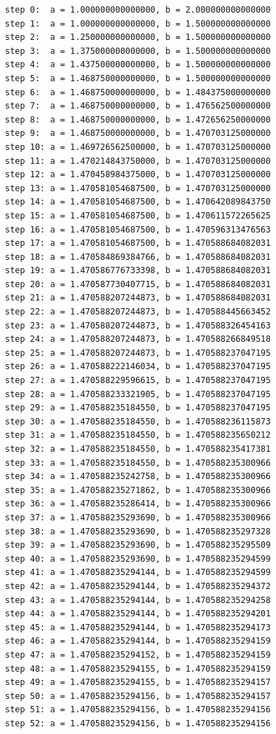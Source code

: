 \documentclass[12pt]{article}
\begin{document}
\begin{minipage}{\linewidth}
\begin{lstlisting}
step 0:  a = 1.000000000000000, b = 2.000000000000000
step 1:  a = 1.000000000000000, b = 1.500000000000000
step 2:  a = 1.250000000000000, b = 1.500000000000000
step 3:  a = 1.375000000000000, b = 1.500000000000000
step 4:  a = 1.437500000000000, b = 1.500000000000000
step 5:  a = 1.468750000000000, b = 1.500000000000000
step 6:  a = 1.468750000000000, b = 1.484375000000000
step 7:  a = 1.468750000000000, b = 1.476562500000000
step 8:  a = 1.468750000000000, b = 1.472656250000000
step 9:  a = 1.468750000000000, b = 1.470703125000000
step 10: a = 1.469726562500000, b = 1.470703125000000
step 11: a = 1.470214843750000, b = 1.470703125000000
step 12: a = 1.470458984375000, b = 1.470703125000000
step 13: a = 1.470581054687500, b = 1.470703125000000
step 14: a = 1.470581054687500, b = 1.470642089843750
step 15: a = 1.470581054687500, b = 1.470611572265625
step 16: a = 1.470581054687500, b = 1.470596313476563
step 17: a = 1.470581054687500, b = 1.470588684082031
step 18: a = 1.470584869384766, b = 1.470588684082031
step 19: a = 1.470586776733398, b = 1.470588684082031
step 20: a = 1.470587730407715, b = 1.470588684082031
step 21: a = 1.470588207244873, b = 1.470588684082031
step 22: a = 1.470588207244873, b = 1.470588445663452
step 23: a = 1.470588207244873, b = 1.470588326454163
step 24: a = 1.470588207244873, b = 1.470588266849518
step 25: a = 1.470588207244873, b = 1.470588237047195
step 26: a = 1.470588222146034, b = 1.470588237047195
step 27: a = 1.470588229596615, b = 1.470588237047195
step 28: a = 1.470588233321905, b = 1.470588237047195
step 29: a = 1.470588235184550, b = 1.470588237047195
step 30: a = 1.470588235184550, b = 1.470588236115873
step 31: a = 1.470588235184550, b = 1.470588235650212
step 32: a = 1.470588235184550, b = 1.470588235417381
step 33: a = 1.470588235184550, b = 1.470588235300966
step 34: a = 1.470588235242758, b = 1.470588235300966
step 35: a = 1.470588235271862, b = 1.470588235300966
step 36: a = 1.470588235286414, b = 1.470588235300966
step 37: a = 1.470588235293690, b = 1.470588235300966
step 38: a = 1.470588235293690, b = 1.470588235297328
step 39: a = 1.470588235293690, b = 1.470588235295509
step 40: a = 1.470588235293690, b = 1.470588235294599
step 41: a = 1.470588235294144, b = 1.470588235294599
step 42: a = 1.470588235294144, b = 1.470588235294372
step 43: a = 1.470588235294144, b = 1.470588235294258
step 44: a = 1.470588235294144, b = 1.470588235294201
step 45: a = 1.470588235294144, b = 1.470588235294173
step 46: a = 1.470588235294144, b = 1.470588235294159
step 47: a = 1.470588235294152, b = 1.470588235294159
step 48: a = 1.470588235294155, b = 1.470588235294159
step 49: a = 1.470588235294155, b = 1.470588235294157
step 50: a = 1.470588235294156, b = 1.470588235294157
step 51: a = 1.470588235294156, b = 1.470588235294156
step 52: a = 1.470588235294156, b = 1.470588235294156
\end{lstlisting}
\end{minipage}
\end{document}
